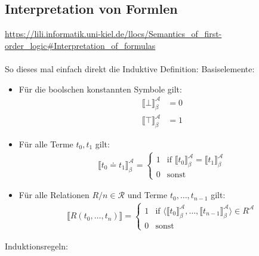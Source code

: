 \documentclass[twocolumn]{article}
\begin{document}
    \subsection{Interpretation von Formlen}
    \url{https://lili.informatik.uni-kiel.de/llocs/Semantics_of_first-order_logic#Interpretation_of_formulas}\\\\
    So dieses mal einfach direkt die Induktive Definition:
    Basiselemente:
    \begin{itemize}
        \item Für die boolschen konstannten Symbole gilt: 
        \begin{align}
            \llbracket \bot \rrbracket_\beta^\mathcal A & = 0\\ 
            \llbracket \top \rrbracket_\beta^\mathcal A & = 1
        \end{align}
        \item Für alle Terme $t_0, t_1$ gilt: 
        \begin{align}
        \llbracket t_0 \doteq t_1 \rrbracket_\beta^\mathcal A = \begin{cases}1 & \text{if } \llbracket t_0 \rrbracket_\beta^\mathcal A = \llbracket t_1 \rrbracket_\beta^\mathcal A\\ 0 & \text{sonst}\end{cases} 
        \end{align}
        \item Für alle Relationen $R/n \in \mathcal R$ und Terme $t_0, \dots, t_{n-1}$ gilt:
        \begin{align}
        \llbracket R(t_0, \dots, t_n)\rrbracket = \begin{cases}1 & \text{if } \langle \llbracket t_0 \rrbracket_\beta^\mathcal A, \dots, \llbracket t_{n-1} \rrbracket_\beta^\mathcal A\rangle \in R^\mathcal A\\ 0 & \text{sonst}\end{cases} 
        \end{align}
    \end{itemize}
    Induktionsregeln:
\end{document}

